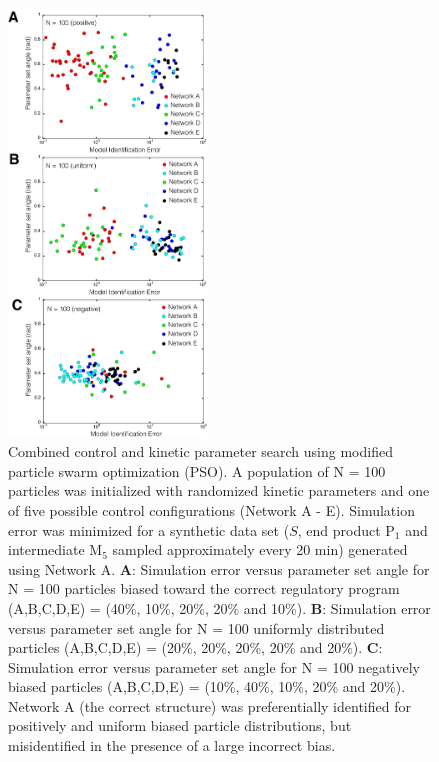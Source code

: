\documentclass[processes,article,accept,moreauthors,pdftex,12pt,a4paper]{mdpi}
\begin{document}
\begin{figure}[H]
\centering
\includegraphics[width=0.47\textwidth]{./figs/Figure-7-ControlSearch.pdf}
\caption{Combined control and kinetic parameter search using modified particle swarm optimization (PSO). 
A population of N = 100 particles was initialized with randomized kinetic parameters and one of five possible control configurations (Network A - E).
Simulation error was minimized for a synthetic data set 
($S$, end product P$_{1}$ and intermediate M$_5$ sampled approximately every 20 min) generated using Network A.
\textbf{A}: Simulation error versus parameter set angle for N = 100 particles biased toward the correct regulatory program (A,B,C,D,E) = (40\%, 10\%, 20\%, 20\% and 10\%).
\textbf{B}: Simulation error versus parameter set angle for N = 100 uniformly distributed particles (A,B,C,D,E) = (20\%, 20\%, 20\%, 20\% and 20\%).
\textbf{C}: Simulation error versus parameter set angle for N = 100 negatively biased particles (A,B,C,D,E) = (10\%, 40\%, 10\%, 20\% and 20\%).
Network A (the correct structure) was preferentially identified for positively and uniform biased particle distributions, but misidentified in the presence of
a large incorrect bias. 
}\label{fig-control-search}
\end{figure}
\end{document}
